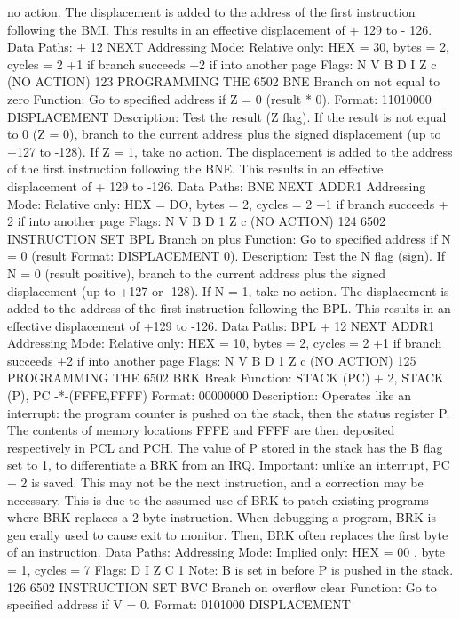 \documentclass{book}
\begin{document}
no action.
The displacement is added to the address of the first instruction
following the BMI. This results in an effective displacement of
+ 129 to - 126.
Data Paths:
+ 12
NEXT
Addressing Mode:
Relative only:
HEX = 30, bytes = 2, cycles = 2 +1 if branch succeeds
+2 if into another page
Flags:
N V B D I Z c
(NO ACTION)
123
PROGRAMMING THE 6502
BNE Branch on not equal to zero
Function:
Go to specified address if Z = 0 (result * 0).
Format: 11010000 DISPLACEMENT
Description:
Test the result (Z flag). If the result is not equal to 0 (Z = 0),
branch to the current address plus the signed displacement (up to
+127 to -128). If Z = 1, take no action.
The displacement is added to the address of the first instruction
following the BNE. This results in an effective displacement of
+ 129 to -126.
Data Paths:
BNE
NEXT ADDR1
Addressing Mode:
Relative only:
HEX = DO, bytes = 2, cycles = 2 +1 if branch succeeds
+ 2 if into another page
Flags:
N V B D 1 Z c
(NO ACTION)
124
6502 INSTRUCTION SET
BPL Branch on plus
Function:
Go to specified address if N = 0 (result
Format: DISPLACEMENT
0).
Description:
Test the N flag (sign). If N = 0 (result positive), branch to the
current address plus the signed displacement (up to +127 or
-128). If N = 1, take no action.
The displacement is added to the address of the first instruction
following the BPL. This results in an effective displacement of
+129 to -126.
Data Paths:
BPL
+ 12
NEXT ADDR1
Addressing Mode:
Relative only:
HEX = 10, bytes = 2, cycles = 2 +1 if branch succeeds
+2 if into another page
Flags:
N V B D 1 Z c
(NO ACTION)
125
PROGRAMMING THE 6502
BRK Break
Function:
STACK (PC) + 2, STACK (P), PC -*-(FFFE,FFFF)
Format: 00000000
Description:
Operates like an interrupt: the program counter is pushed on
the stack, then the status register P. The contents of memory
locations FFFE and FFFF are then deposited respectively in PCL
and PCH. The value of P stored in the stack has the B flag set to 1,
to differentiate a BRK from an IRQ.
Important: unlike an interrupt, PC + 2 is saved. This may not
be the next instruction, and a correction may be necessary. This is
due to the assumed use of BRK to patch existing programs where BRK
replaces a 2-byte instruction. When debugging a program, BRK is gen
erally used to cause exit to monitor. Then, BRK often replaces the first
byte of an instruction.
Data Paths:
Addressing Mode:
Implied only:
HEX = 00 , byte = 1, cycles = 7
Flags:
D I Z C
1
Note: B is set in before P is pushed in the stack.
126
6502 INSTRUCTION SET
BVC Branch on overflow clear
Function:
Go to specified address if V = 0.
Format: 0101000 DISPLACEMENT
\end{document}
